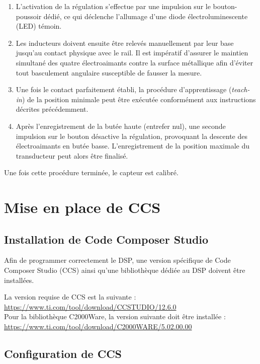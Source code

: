 \begin{enumerate}
  \item L'activation de la régulation s'effectue par une impulsion sur le bouton-poussoir dédié, ce qui déclenche l'allumage d'une diode électroluminescente (LED) témoin.
  \item Les inducteurs doivent ensuite être relevés manuellement par leur base jusqu'au contact physique avec le rail. Il est impératif d'assurer le maintien simultané des quatre électroaimants contre la surface métallique afin d'éviter tout basculement angulaire susceptible de fausser la mesure.
  \item Une fois le contact parfaitement établi, la procédure d'apprentissage (\textit{teach-in}) de la position minimale peut être exécutée conformément aux instructions décrites précédemment.
  \item Après l'enregistrement de la butée haute (entrefer nul), une seconde impulsion sur le bouton désactive la régulation, provoquant la descente des électroaimants en butée basse. L'enregistrement de la position maximale du transducteur peut alors être finalisé.
\end{enumerate}

Une fois cette procédure terminée, le capteur est calibré.

\section{Mise en place de CCS}
\label{sec:MiseEnPlace}
\subsection{Installation de Code Composer Studio}
Afin de programmer correctement le DSP, une version spécifique de Code Composer Studio (CCS) ainsi qu'une bibliothèque dédiée au DSP doivent être installées.

La version requise de CCS est la suivante \cite{CCS_Install} :
\url{https://www.ti.com/tool/download/CCSTUDIO/12.6.0} \\

Pour la bibliothèque C2000Ware, la version suivante doit être installée \cite{C2000_Install} :
\url{https://www.ti.com/tool/download/C2000WARE/5.02.00.00}\\

\subsection{Configuration de CCS}

